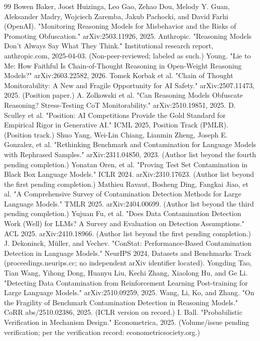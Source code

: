 \documentclass[11pt,a4paper]{article}
\begin{document}
\begin{thebibliography}{99}
 Bowen Baker, Joost Huizinga, Leo Gao, Zehao Dou, Melody Y. Guan, Aleksander Madry, Wojciech Zaremba, Jakub Pachocki, and David Farhi (OpenAI). "Monitoring Reasoning Models for Misbehavior and the Risks of Promoting Obfuscation." arXiv:2503.11926, 2025.
 Anthropic. "Reasoning Models Don't Always Say What They Think." Institutional research report, anthropic.com, 2025-04-03. (Non-peer-reviewed; labeled as such.)
 Young. "Lie to Me: How Faithful Is Chain-of-Thought Reasoning in Open-Weight Reasoning Models?" arXiv:2603.22582, 2026.
 Tomek Korbak et al. "Chain of Thought Monitorability: A New and Fragile Opportunity for AI Safety." arXiv:2507.11473, 2025. (Position paper.)
 A. Zolkowski et al. "Can Reasoning Models Obfuscate Reasoning? Stress-Testing CoT Monitorability." arXiv:2510.19851, 2025.
 D. Sculley et al. "Position: AI Competitions Provide the Gold Standard for Empirical Rigor in Generative AI." ICML 2025, Position Track (PMLR). (Position track.)
 Shuo Yang, Wei-Lin Chiang, Lianmin Zheng, Joseph E. Gonzalez, et al. "Rethinking Benchmark and Contamination for Language Models with Rephrased Samples." arXiv:2311.04850, 2023. (Author list beyond the fourth pending completion.)
 Yonatan Oren, et al. "Proving Test Set Contamination in Black Box Language Models." ICLR 2024. arXiv:2310.17623. (Author list beyond the first pending completion.)
 Mathieu Ravaut, Bosheng Ding, Fangkai Jiao, et al. "A Comprehensive Survey of Contamination Detection Methods for Large Language Models." TMLR 2025. arXiv:2404.00699. (Author list beyond the third pending completion.)
 Yujuan Fu, et al. "Does Data Contamination Detection Work (Well) for LLMs? A Survey and Evaluation on Detection Assumptions." ACL 2025. arXiv:2410.18966. (Author list beyond the first pending completion.)
 J. Dekoninck, Müller, and Vechev. "ConStat: Performance-Based Contamination Detection in Language Models." NeurIPS 2024, Datasets and Benchmarks Track (proceedings.neurips.cc; no independent arXiv identifier located).
 Yongding Tao, Tian Wang, Yihong Dong, Huanyu Liu, Kechi Zhang, Xiaolong Hu, and Ge Li. "Detecting Data Contamination from Reinforcement Learning Post-training for Large Language Models." arXiv:2510.09259, 2025.
 Wang, Li, Ko, and Zhang. "On the Fragility of Benchmark Contamination Detection in Reasoning Models." CoRR abs/2510.02386, 2025. (ICLR version on record.)
 I. Ball. "Probabilistic Verification in Mechanism Design." Econometrica, 2025. (Volume/issue pending verification; per the verification record: econometricsociety.org.)

\end{thebibliography}
\end{document}
